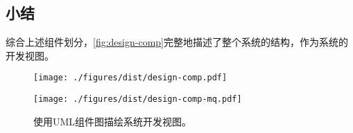 \documentclass[index]{subfiles}
\begin{document}
\subsection{小结}
综合上述组件划分，\cref{fig:design-comp}完整地描述了整个系统的结构，作为系统的开发视图。
\begin{figure}[h]
  \centering%
    {\texttt{[image: ./figures/dist/design-comp.pdf]}}\par
    {\texttt{[image: ./figures/dist/design-comp-mq.pdf]}}
  \caption[系统开发视图]{使用UML组件图描绘系统开发视图。}
\end{figure}
\end{document}
